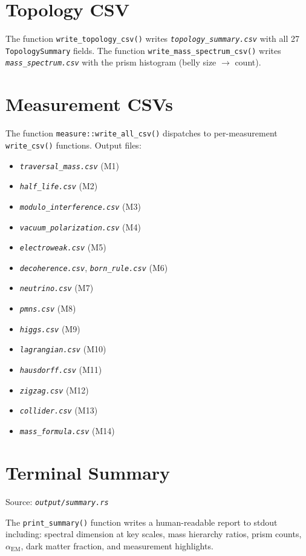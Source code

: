 \documentclass[11pt, a4paper, openany]{book}
\newcommand{\code}[1]{\texttt{#1}}
\newcommand{\func}[1]{\texttt{\color{structure}#1}}
\newcommand{\file}[1]{\texttt{\itshape #1}}
\begin{document}
\section{Topology CSV}

The function \func{write\_topology\_csv()} writes \file{topology\_summary.csv}
with all 27 \code{TopologySummary} fields.  The function
\func{write\_mass\_spectrum\_csv()} writes \file{mass\_spectrum.csv} with the
prism histogram (belly size $\to$ count).

\section{Measurement CSVs}

The function \func{measure::write\_all\_csv()} dispatches to per-measurement
\func{write\_csv()} functions.  Output files:

\begin{itemize}
  \item \file{traversal\_mass.csv} (M1)
  \item \file{half\_life.csv} (M2)
  \item \file{modulo\_interference.csv} (M3)
  \item \file{vacuum\_polarization.csv} (M4)
  \item \file{electroweak.csv} (M5)
  \item \file{decoherence.csv}, \file{born\_rule.csv} (M6)
  \item \file{neutrino.csv} (M7)
  \item \file{pmns.csv} (M8)
  \item \file{higgs.csv} (M9)
  \item \file{lagrangian.csv} (M10)
  \item \file{hausdorff.csv} (M11)
  \item \file{zigzag.csv} (M12)
  \item \file{collider.csv} (M13)
  \item \file{mass\_formula.csv} (M14)
\end{itemize}

\section{Terminal Summary}

Source: \file{output/summary.rs}

The \func{print\_summary()} function writes a human-readable report to stdout
including: spectral dimension at key scales, mass hierarchy ratios, prism counts,
$\alpha_{\text{EM}}$, dark matter fraction, and measurement highlights.
\end{document}
